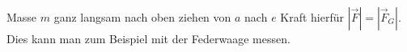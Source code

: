 \documentclass[a4paper,10pt]{scrartcl}
\begin{document}
% 
\\
Masse $m$ ganz langsam nach oben ziehen von $a$ nach $e$ Kraft hierfür $|\vec F|=|\vec F_G|$. Dies kann man zum Beispiel mit der Federwaage messen.
\end{document}
